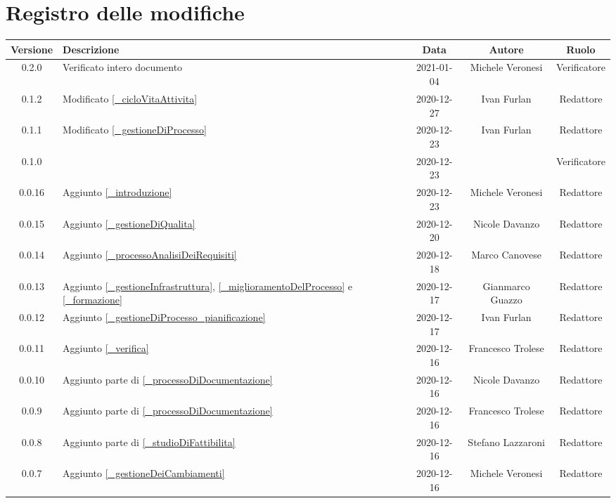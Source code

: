 \section*{Registro delle modifiche}

\begin{center}
	\begin{longtable}{|c|p{5cm}|c|c|c|}
		\hline
		\rowcolor{lighter-grayer}
		\textbf{Versione} & \textbf{Descrizione} & \textbf{Data} & \textbf{Autore} & \textbf{Ruolo} \\
		\hline
		\endfirsthead


		0.2.0 & Verificato intero documento & 2021-01-04 & Michele Veronesi & Verificatore \\
		0.1.2 & Modificato \ref{_cicloVitaAttivita} & 2020-12-27& Ivan Furlan & Redattore \\
		0.1.1 & Modificato \ref{_gestioneDiProcesso} & 2020-12-23 & Ivan Furlan & Redattore \\
		0.1.0 &  & 2020-12-23 &  & Verificatore \\
		0.0.16 & Aggiunto \ref{_introduzione} & 2020-12-23 & Michele Veronesi & Redattore \\
		0.0.15 & Aggiunto \ref{_gestioneDiQualita} & 2020-12-20 & Nicole Davanzo & Redattore \\
		0.0.14 & Aggiunto \ref{_processoAnalisiDeiRequisiti} & 2020-12-18 & Marco Canovese & Redattore \\
		0.0.13 & Aggiunto \ref{_gestioneInfrastruttura}, \ref{_miglioramentoDelProcesso} e \ref{_formazione} & 2020-12-17 & Gianmarco Guazzo & Redattore \\
		0.0.12 & Aggiunto \ref{_gestioneDiProcesso_pianificazione} & 2020-12-17 & Ivan Furlan & Redattore \\
		0.0.11 & Aggiunto \ref{_verifica} & 2020-12-16 & Francesco Trolese & Redattore \\
		0.0.10 & Aggiunto parte di \ref{_processoDiDocumentazione} & 2020-12-16 & Nicole Davanzo & Redattore \\
		0.0.9 & Aggiunto parte di \ref{_processoDiDocumentazione} & 2020-12-16 & Francesco Trolese & Redattore \\
		0.0.8 & Aggiunto parte di \ref{_studioDiFattibilita} & 2020-12-16 & Stefano Lazzaroni & Redattore \\
		0.0.7 & Aggiunto \ref{_gestioneDeiCambiamenti} & 2020-12-16 & Michele Veronesi & Redattore \\

\end{longtable}
\end{center}
